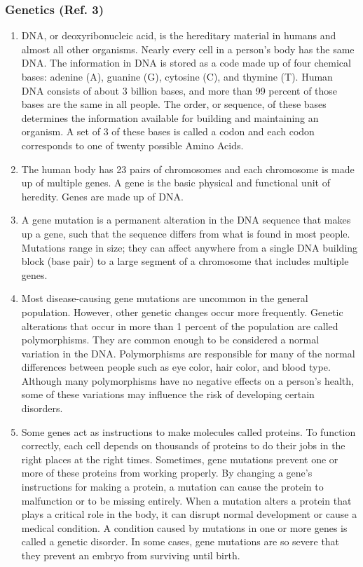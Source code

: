 \documentclass[twoside]{article}
\begin{document}
		 \subsubsection{Genetics (Ref. 3)}
	\begin{enumerate}
		\item DNA, or deoxyribonucleic acid, is the hereditary material in humans and almost all other organisms. Nearly every cell in a person’s body has the same DNA. The information in DNA is stored as a code made up of four chemical bases: adenine (A), guanine (G), cytosine (C), and thymine (T). Human DNA consists of about 3 billion bases, and more than 99 percent of those bases are the same in all people. The order, or sequence, of these bases determines the information available for building and maintaining an organism. A set of 3 of these bases is called a codon and each codon corresponds to one of twenty possible Amino Acids.
		\item The human body has 23 pairs of chromosomes and each chromosome is made up of multiple genes. A gene is the basic physical and functional unit of heredity. Genes are made up of DNA. 
		\item A gene mutation is a permanent alteration in the DNA sequence that makes up a gene, such that the sequence differs from what is found in most people. Mutations range in size; they can affect anywhere from a single DNA building block (base pair) to a large segment of a chromosome that includes multiple genes.
		\item Most disease-causing gene mutations are uncommon in the general population. However, other genetic changes occur more frequently. Genetic alterations that occur in more than 1 percent of the population are called polymorphisms. They are common enough to be considered a normal variation in the DNA. Polymorphisms are responsible for many of the normal differences between people such as eye color, hair color, and blood type. Although many polymorphisms have no negative effects on a person’s health, some of these variations may influence the risk of developing certain disorders.
		\item Some genes act as instructions to make molecules called proteins. To function correctly, each cell depends on thousands of proteins to do their jobs in the right places at the right times. Sometimes, gene mutations prevent one or more of these proteins from working properly. By changing a gene’s instructions for making a protein, a mutation can cause the protein to malfunction or to be missing entirely. When a mutation alters a protein that plays a critical role in the body, it can disrupt normal development or cause a medical condition. A condition caused by mutations in one or more genes is called a genetic disorder. In some cases, gene mutations are so severe that they prevent an embryo from surviving until birth.

\end{enumerate}
\end{document}
